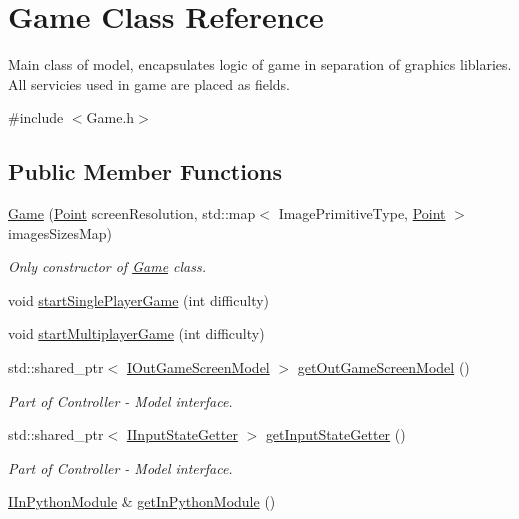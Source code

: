 \hypertarget{classGame}{}\section{Game Class Reference}
\label{classGame}


Main class of model, encapsulates logic of game in separation of graphics liblaries. All servicies used in game are placed as fields.  




{\ttfamily \#include $<$Game.\+h$>$}

\subsection*{Public Member Functions}
\begin{DoxyCompactItemize}
\item 
\hyperlink{classGame_a4983cf735131975a2ff0138fcf7ba4ec}{Game} (\hyperlink{classPoint}{Point} screen\+Resolution, std\+::map$<$ Image\+Primitive\+Type, \hyperlink{classPoint}{Point} $>$ images\+Sizes\+Map)
\begin{DoxyCompactList}\small\item\em Only constructor of \hyperlink{classGame}{Game} class. \end{DoxyCompactList}\item 
void \hyperlink{classGame_a7c48a1b39635e2f1396867845dbf0540}{start\+Single\+Player\+Game} (int difficulty)
\item 
void \hyperlink{classGame_a139e4519b3e9ce6320f56f1ed6738c0b}{start\+Multiplayer\+Game} (int difficulty)
\item 
std\+::shared\+\_\+ptr$<$ \hyperlink{classIOutGameScreenModel}{I\+Out\+Game\+Screen\+Model} $>$ \hyperlink{classGame_adbf1e6c86cc2e767a4ab355fc41484f0}{get\+Out\+Game\+Screen\+Model} ()
\begin{DoxyCompactList}\small\item\em Part of Controller -\/ Model interface. \end{DoxyCompactList}\item 
std\+::shared\+\_\+ptr$<$ \hyperlink{classIInputStateGetter}{I\+Input\+State\+Getter} $>$ \hyperlink{classGame_ab5e270ad252bb80ffcbf0299c3cc28d9}{get\+Input\+State\+Getter} ()
\begin{DoxyCompactList}\small\item\em Part of Controller -\/ Model interface. \end{DoxyCompactList}\item 
\hyperlink{classIInPythonModule}{I\+In\+Python\+Module} \& \hyperlink{classGame_af39898371230b44a33e28bfa8ff6b4da}{get\+In\+Python\+Module} ()

\end{DoxyCompactItemize}
